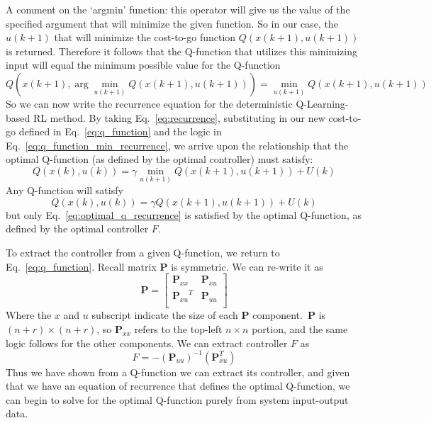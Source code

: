 A comment on the `argmin' function: this operator will give us the value of the specified argument that will minimize the given function. So in our case, the $u\left(k+1\right)$ that will minimize the cost-to-go function $Q\left(x\left(k+1\right),u\left(k+1\right)\right)$ is returned. Therefore it follows that the Q-function that utilizes this minimizing input will equal the minimum possible value for the Q-function
\begin{equation}
    Q(x(k+1), \arg{\min_{u\left(k+1\right)}}Q(x(k+1), u(k+1)))=\min_{u\left(k+1\right)}Q(x(k+1), u(k+1))
    \label{eq:q_function_min_recurrence}
\end{equation}
So we can now write the recurrence equation for the deterministic Q-Learning-based RL method. By taking Eq.~\ref{eq:recurrence}, substituting in our new cost-to-go defined in Eq.~\ref{eq:q_function} and the logic in Eq.~\ref{eq:q_function_min_recurrence}, we arrive upon the relationship that the optimal Q-function (as defined by the optimal controller) must satisfy:
\begin{equation}
    Q\left(x\left(k\right),u\left(k\right)\right)=\gamma \min_{u\left(k+1\right)}{Q\left(x\left(k+1\right),u\left(k+1\right)\right)+U\left(k\right)}
    \label{eq:optimal_q_recurrence}
\end{equation}
Any Q-function will satisfy
\begin{equation}
    Q\left(x\left(k\right),u\left(k\right)\right)=\gamma Q\left(x\left(k+1\right),u\left(k+1\right)\right)+U\left(k\right)
    \label{eq:q_recurrence}
\end{equation}
but only Eq.~\ref{eq:optimal_q_recurrence} is satisfied by the optimal Q-function, as defined by the optimal controller $F$.

To extract the controller from a given Q-function, we return to Eq.~\ref{eq:q_function}. Recall matrix \textbf{P} is symmetric. We can re-write it as
\begin{equation}
    \textbf{P}=\left[\begin{matrix}\textbf{P}_{xx}&\textbf{P}_{xu}\\{\textbf{P}_{xu}}^T&\textbf{P}_{uu}\\\end{matrix}\right]
    \label{eq:sym_P_rl}
\end{equation}
Where the $x$ and $u$ subscript indicate the size of each \textbf{P} component.\ \textbf{P} is $\left(n+r\right)\times \left(n+r\right)$, so $\textbf{P}_{xx}$ refers to the top-left $n \times n$ portion, and the same logic follows for the other components. We can extract controller $F$ as
\begin{equation}
    F=-{\left(\textbf{P}_{uu}\right)}^{-1}\left(\textbf{P}_{xu}^T\right)
    \label{eq:F_from_P}
\end{equation}
Thus we have shown from a Q-function we can extract its controller, and given that we have an equation of recurrence that defines the optimal Q-function, we can begin to solve for the optimal Q-function purely from system input-output data.

